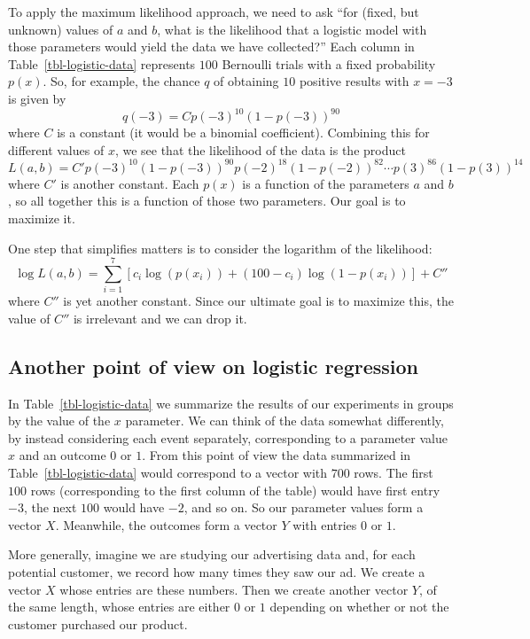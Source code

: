 \documentclass[
  11pt,
  letterpaper,
]{scrbook}
\theoremstyle{plain}
\theoremstyle{remark}
\begin{document}
To apply the maximum likelihood approach, we need to ask ``for (fixed,
but unknown) values of \(a\) and \(b\), what is the likelihood that a
logistic model with those parameters would yield the data we have
collected?'' Each column in Table~\ref{tbl-logistic-data} represents
\(100\) Bernoulli trials with a fixed probability \(p(x)\). So, for
example, the chance \(q\) of obtaining \(10\) positive results with
\(x=-3\) is given by \[
q(-3)=C p(-3)^{10}(1-p(-3))^{90}
\] where \(C\) is a constant (it would be a binomial coefficient).
Combining this for different values of \(x\), we see that the likelihood
of the data is the product \[
L(a,b) = C' p(-3)^{10}(1-p(-3))^{90}p(-2)^{18}(1-p(-2))^{82}\cdots p(3)^{86}(1-p(3))^{14}
\] where \(C'\) is another constant. Each \(p(x)\) is a function of the
parameters \(a\) and \(b\), so all together this is a function of those
two parameters. Our goal is to maximize it.

One step that simplifies matters is to consider the logarithm of the
likelihood: \[
\log L (a,b)= \sum_{i=1}^{7} \left[ c_{i}\log(p(x_{i})) + (100-c_{i})\log(1-p(x_{i}))\right] +C''
\] where \(C''\) is yet another constant. Since our ultimate goal is to
maximize this, the value of \(C''\) is irrelevant and we can drop it.

\hypertarget{another-point-of-view-on-logistic-regression}{%
\subsection{Another point of view on logistic
regression}\label{another-point-of-view-on-logistic-regression}}

In Table~\ref{tbl-logistic-data} we summarize the results of our
experiments in groups by the value of the \(x\) parameter. We can think
of the data somewhat differently, by instead considering each event
separately, corresponding to a parameter value \(x\) and an outcome
\(0\) or \(1\). From this point of view the data summarized in
Table~\ref{tbl-logistic-data} would correspond to a vector with \(700\)
rows. The first \(100\) rows (corresponding to the first column of the
table) would have first entry \(-3\), the next \(100\) would have
\(-2\), and so on. So our parameter values form a vector \(X\).
Meanwhile, the outcomes form a vector \(Y\) with entries \(0\) or \(1\).

More generally, imagine we are studying our advertising data and, for
each potential customer, we record how many times they saw our ad. We
create a vector \(X\) whose entries are these numbers. Then we create
another vector \(Y\), of the same length, whose entries are either \(0\)
or \(1\) depending on whether or not the customer purchased our product.
\end{document}
